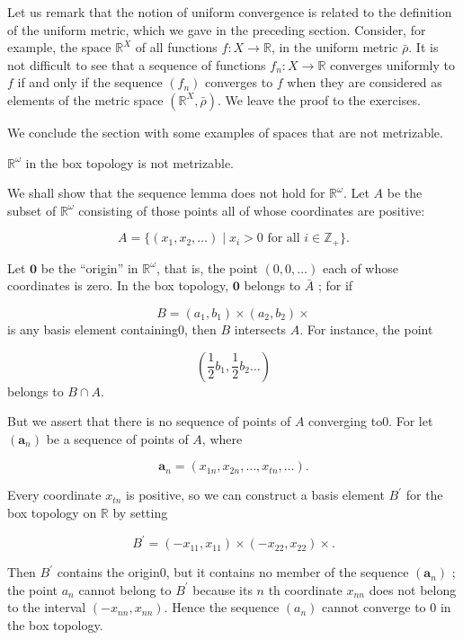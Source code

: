 Let us remark that the notion of uniform convergence is related to the definition of the uniform metric, which we gave in the preceding section. Consider, for example, the space \(\mathbb{R}^{X}\) of all functions \(f : X \rightarrow \mathbb{R}\), in the uniform metric \(\bar{\rho }\). It is not difficult to see that a sequence of functions \(f_{n} : X \rightarrow \mathbb{R}\) converges uniformly to \(f\) if and only if the sequence \(( f_{n})\) converges to \(f\) when they are considered as elements of the metric space \(( {\mathbb{R}^{X},\bar{\rho }})\). We leave the proof to the exercises.

We conclude the section with some examples of spaces that are not metrizable.

\begin{centeredblock*}
\begin{example}
\label{ex:\thesection.\theexample}
 \(\mathbb{R}^{\omega }\) in the box topology is not metrizable.

 We shall show that the sequence lemma does not hold for \(\mathbb{R}^{\omega }\). Let \(A\) be the subset of \(\mathbb{R}^{\omega }\) consisting of those points all of whose coordinates are positive:

 \[
 A = \{ {( {x_{1},x_{2},\ldots }) \mid {x}_{i} > 0\text{ for all }i \in {\mathbb{Z}}_{ + }}\}.
 \]

 Let \(\mathbf{0}\) be the ``origin'' in \(\mathbb{R}^{\omega }\), that is, the point \((0,0,\ldots)\) each of whose coordinates is zero. In the box topology, \(\mathbf{0}\) belongs to \(\bar{A}\) ; for if

 \[
 B = ( {a_{1},b_{1}}) \times ( {a_{2},b_{2}}) \times
 \]
 is any basis element containing0, then \(B\) intersects \(A\). For instance, the point

 \[
 ( {\frac{1}{2}b_{1},\frac{1}{2}b_{2}\ldots })
 \]
 belongs to \(B \cap A\).

 But we assert that there is no sequence of points of \(A\) converging to0. For let \(( \mathbf{a}_{n})\) be a sequence of points of \(A\), where

 \[
 \mathbf{a}_{n} = ( {x_{1n},x_{2n},\ldots,x_{tn},\ldots }).
 \]

Every coordinate \(x_{tn}\) is positive, so we can construct a basis element \(B^{\prime }\) for the box topology on \(\mathbb{R}\) by setting

 \[
 B^{\prime } = ( {-x_{11},x_{11}}) \times ( {-x_{22},x_{22}}) \times .
 \]

 Then \(B^{\prime }\) contains the origin0, but it contains no member of the sequence \(( \mathbf{a}_{n})\) ; the point \(a_{n}\) cannot belong to \(B^{\prime }\) because its \(n\) th coordinate \(x_{nn}\) does not belong to the interval \(( {-x_{nn},x_{nn}})\). Hence the sequence \(( a_{n})\) cannot converge to 0 in the box topology.
\end{example}
\end{centeredblock*}

